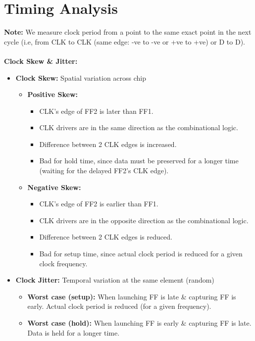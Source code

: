 \documentclass[11pt]{article}
\begin{document}
\section*{Timing Analysis}
    \textbf{Note: } We measure clock period from a point to the same exact point in the next cycle (i.e, from CLK to CLK (same edge: -ve to -ve or +ve to +ve) or D to D).\\ \\
    \textbf{Clock Skew \& Jitter:} 
    \begin{itemize}
        \item \textbf{Clock Skew:} Spatial variation across chip
        \begin{itemize}
            \item \textbf{Positive Skew:} 
            \begin{itemize}
                \item CLK's edge of FF2 is later than FF1. 
                \item CLK drivers are in the same direction as the combinational logic.
                \item Difference between 2 CLK edges is increased.
                \item Bad for hold time, since data must be preserved for a longer time (waiting for the delayed FF2's CLK edge).
            \end{itemize}
            \item \textbf{Negative Skew:}
            \begin{itemize}
                \item CLK's edge of FF2 is earlier than FF1. 
                \item CLK drivers are in the opposite direction as the combinational logic.
                \item Difference between 2 CLK edges is reduced.
                \item Bad for setup time, since actual clock period is reduced for a given clock frequency.
            \end{itemize}
        \end{itemize}
        \item \textbf{Clock Jitter:} Temporal variation at the same element (random)
        \begin{itemize}
            \item \textbf{Worst case (setup): } When launching FF is late \& capturing FF is early. Actual clock period is reduced (for a given frequency).
            \item \textbf{Worst case (hold): } When launching FF is early \& capturing FF is late. Data is held for a longer time.
        \end{itemize}
    \end{itemize}
\end{document}

